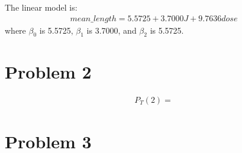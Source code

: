\documentclass[11pt]{article}
\begin{document}
The linear model is:
\begin{align*}
    mean\_length = 5.5725 + 3.7000 J + 9.7636 dose
\end{align*}
where $\beta_0$ is 5.5725, $\beta_1$ is 3.7000, and $\beta_2$ is 5.5725.

\section*{Problem 2}
\begin{align*}
    P_T(2) = 
\end{align*}

\section*{Problem 3}
\begin{lstlisting}[language=R]

\end{lstlisting}
\end{document}
